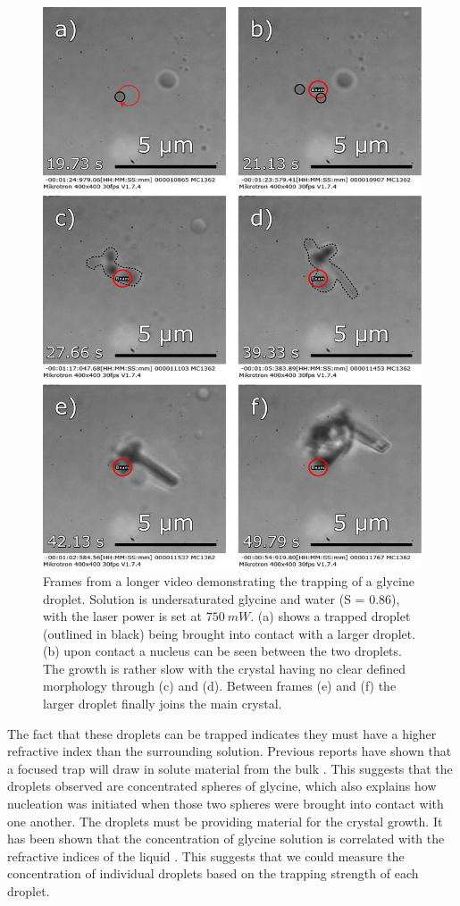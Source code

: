 \begin{figure}[h!]
	\centering
	\includegraphics[width=0.8\linewidth]{cluster_trapping.pdf}
	\caption{Frames from a longer video demonstrating the trapping 
		of a glycine droplet. Solution is undersaturated glycine 
		and water (S = 0.86), with the laser power is set at $750\ 
		mW$. (a) shows a trapped droplet (outlined in black) being 
		brought into contact with a larger droplet. (b) upon contact 
		a nucleus can be seen between the two droplets. The growth 
		is rather slow with the crystal having no clear defined 
		morphology through (c) and (d). Between frames (e) and (f) 
		the larger droplet finally joins the main crystal.}
	\label{fig:cluster_trapping}
\end{figure}

The fact that these droplets can be trapped indicates 
they must have a higher refractive index than the 
surrounding solution. Previous reports have shown that 
a focused trap will draw in solute material from the 
bulk \cite{Tsuboi2009, Gowayed2021}. This suggests that 
the droplets observed are concentrated spheres of glycine, 
which also explains how nucleation was initiated when those
two spheres were brought into contact with one another. The 
droplets must be providing material for the crystal growth.
It has been shown that the concentration of glycine solution 
is correlated with the refractive indices of the liquid 
\cite{Gowayed2021, Orttung1963}. This suggests that we could
measure the concentration of individual droplets based on the
trapping strength of each droplet. 
\newpage

